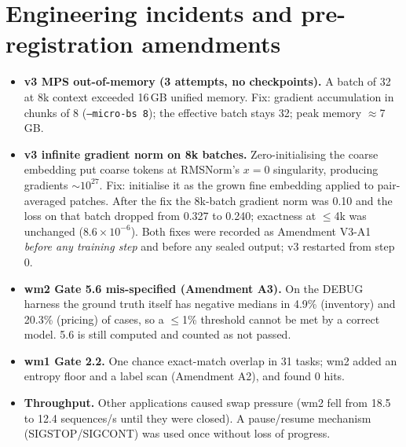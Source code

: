 \documentclass[10pt,a4paper]{extarticle}
\newcommand{\code}[1]{\texttt{\small #1}}
\begin{document}
\section{Engineering incidents and pre-registration amendments}
\label{sec:incidents}
\begin{itemize}
\item \textbf{v3 MPS out-of-memory (3 attempts, no checkpoints).} A batch of 32 at 8k context exceeded 16\,GB unified memory.
Fix: gradient accumulation in chunks of 8 (\code{--micro-bs 8}); the effective batch stays 32; peak memory $\approx$7\,GB.
\item \textbf{v3 infinite gradient norm on 8k batches.} Zero-initialising the coarse embedding put coarse tokens at RMSNorm's
$x=0$ singularity, producing gradients $\sim10^{27}$. Fix: initialise it as the grown fine embedding applied to pair-averaged
patches. After the fix the 8k-batch gradient norm was 0.10 and the loss on that batch dropped from 0.327 to 0.240; exactness at
$\le$4k was unchanged ($8.6\times10^{-6}$). Both fixes were recorded as Amendment V3-A1 \emph{before any training step} and
before any sealed output; v3 restarted from step 0.
\item \textbf{wm2 Gate 5.6 mis-specified (Amendment A3).} On the DEBUG harness the ground truth itself has negative medians in
4.9\% (inventory) and 20.3\% (pricing) of cases, so a $\le$1\% threshold cannot be met by a correct model. 5.6 is still computed and
counted as not passed.
\item \textbf{wm1 Gate 2.2.} One chance exact-match overlap in 31 tasks; wm2 added an entropy floor and a label scan (Amendment A2),
and found 0 hits.
\item \textbf{Throughput.} Other applications caused swap pressure (wm2 fell from 18.5 to 12.4 sequences/s until they were closed).
A pause/resume mechanism (SIGSTOP/SIGCONT) was used once without loss of progress.
\end{itemize}

\end{document}
